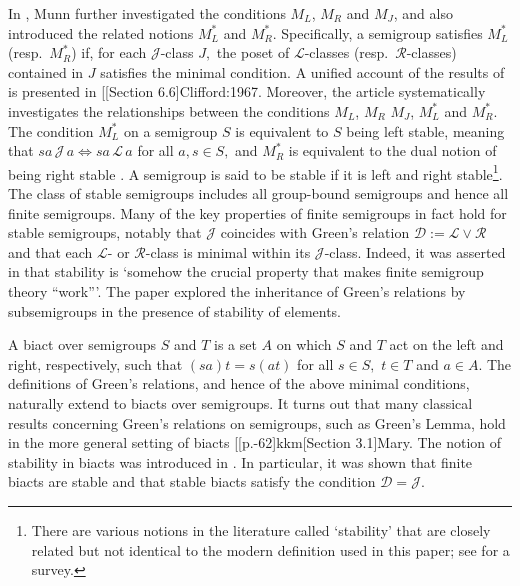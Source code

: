 \documentclass[twoside,a4paper,12pt,reqno]{amsart}
\makeatletter
\newcommand{\citecomment}[2][]{\citen{#2}#1\citevar}
\newcommand{\citeone}[1]{\citecomment{#1}}
\newcommand{\citetwo}[2][]{\citecomment[,~#1]{#2}}
\newcommand{\citevar}{\@ifnextchar\bgroup{;~\citeone}{\@ifnextchar[{;~\citetwo}{]}}}
\newcommand{\citefirst}{\@ifnextchar\bgroup{\citeone}{\@ifnextchar[{\citetwo}{]}}}
\newcommand{\cites}{[\citefirst}
\theoremstyle{plain}
\theoremstyle{definition}
\renewcommand{\l}{\mbox{${\mathcal{L}}$}}
\renewcommand{\r}{\mbox{${\mathcal{R}}$}}
\newcommand{\h}{\mbox{${\mathcal{H}}$}}
\renewcommand{\d}{\mbox{${\mathcal{D}}$}}
\renewcommand{\j}{\mbox{${\mathcal{J}}$}}
\makeatother
\begin{document}
In \cite{Munn}, Munn further investigated the conditions $M_L$, $M_R$ and $M_J$, and also introduced the related notions $M_L^*$ and $M_R^*$.  Specifically, a semigroup satisfies $M_L^*$ (resp.\ $M_R^*$) if, for each $\j$-class $J,$ the poset of $\l$-classes (resp.\ $\r$-classes) contained in $J$ satisfies the minimal condition.  A unified account of the results of \cite{Green,Munn} is presented in \cites[Section 6.6]{Clifford:1967}.  Moreover, the article \cite{Hall} systematically investigates the relationships between the conditions $M_L$, $M_R$ $M_J$, $M_L^*$ and $M_R^*$.  The condition $M_L^*$ on a semigroup $S$ is equivalent to $S$ being left stable, meaning that $sa\,\j\,a\Leftrightarrow sa\,\l\,a$ for all $a,s\in S,$ and $M_R^*$ is equivalent to the dual notion of being right stable \cite[Proposition 3.7]{Lallement}.  A semigroup is said to be stable if it is left and right stable\footnote{There are various notions in the literature called ‘stability’ that are closely related but not identical to the modern definition used in this paper; see \cite{East} for a survey.}.  The class of stable semigroups includes all group-bound semigroups \cite[Theorem 1.2(vi)]{Hall} and hence all finite semigroups.  Many of the key properties of finite semigroups in fact hold for stable semigroups, notably that $\j$ coincides with Green's relation $\d:=\l\vee\r$ and that each $\l$- or $\r$-class is minimal within its $\j$-class.  Indeed, it was asserted in \cite[Section A.2]{Rhodes} that stability is `somehow the crucial property that makes finite semigroup theory ``work'''.  
The paper \cite{East} explored the inheritance of Green's relations by subsemigroups in the presence of stability of elements. 

A biact over semigroups $S$ and $T$ is a set $A$ on which $S$ and $T$ act on the left and right, respectively, such that $(sa)t=s(at)$ for all $s\in S,$ $t\in T$ and $a\in A.$  The definitions of Green's relations, and hence of the above minimal conditions, naturally extend to biacts over semigroups.  It turns out that many classical results concerning Green's relations on semigroups, such as Green's Lemma, hold in the more general setting of biacts \cites[p.-62]{kkm}[Section 3.1]{Mary}.  The notion of stability in biacts was introduced in \cite[Section 3.2]{Mary}.  In particular, it was shown that finite biacts are stable and that stable biacts satisfy the condition $\d=\j.$
\end{document}
